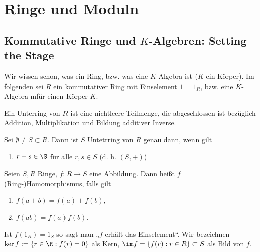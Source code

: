 \chapter{Ringe und Moduln}



\section{Kommutative Ringe und $K$-Algebren: Setting the Stage}

Wir wissen schon, was ein Ring, bzw. was eine $K$-Algebra ist ($K$ ein Körper).
Im folgenden sei $R$ ein kommutativer Ring mit Einselement $1 = 1_R$, bzw. eine $K$-Algebra mfür einen Körper $K$.

Ein Unterring von $R$ ist eine nichtleere Teilmenge, die abgeschlossen ist bezüglich Addition, Multiplikation und Bildung additiver Inverse.

\begin{df}
	Sei $\emptyset \neq S \subset R$.
	Dann ist $S$ Untetrring von $R$ genau dann, wenn gilt
	\begin{enumerate}[1.]
		\item
			$r -s \in \S$ für alle $r, s \in S$ (d. h. $(S, +)$)
	\end{enumerate}
\end{df}

\begin{df}
	Seien $S, R$ Ringe, $f: R \to S$ eine Abbildung.
	Dann heißt $f$ (Ring-)Homomorphismus, falls gilt
	\begin{enumerate}[1.]
		\item
			$f(a + b) = f(a) + f(b)$,
		\item
			$f(ab) = f(a)f(b)$.
	\end{enumerate}
	Ist $f(1_R) = 1_S$ so sagt man „$f$ erhält das Einselement“.
	Wir bezeichnen $\ker f := \{r \in \R : f(r) = 0\}$ als Kern, $\im f = \{ f(r) : r \in R \} \subset S$ als Bild von $f$.

\end{df}

